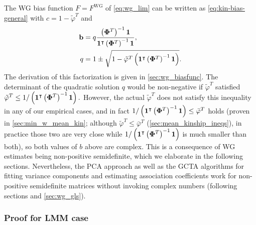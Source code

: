 \documentclass[11pt]{article}
\newcommand{\kinMat}[1][T]{%
  \ensuremath{%
    \mathbf{\Phi}^{#1}
  }%
  \xspace%
}%
\begin{document}
The WG bias function $F = F^\text{WG}$ of \cref{eq:wg_lim} can be written as \cref{eq:kin-bias-general} with
$c = 1 - \tilde{\varphi}^T$ and
\begin{align}
  \label{eq:wg-fac-b}
  \mathbf{b}
  &=
    q \frac{ \left( \kinMat \right)^{-1} \mathbf{1} }{ \mathbf{1}^\intercal \left( \kinMat \right)^{-1} \mathbf{1} }
    , \\
  \label{eq:wg-fac-q}
  q
  &=
    1 \pm \sqrt{1 - \tilde{\varphi}^T \left( \mathbf{1}^\intercal \left( \kinMat \right)^{-1} \mathbf{1} \right) }
.
\end{align}
The derivation of this factorization is given in \cref{sec:wg_biasfunc}.
The determinant of the quadratic solution $q$ would be non-negative if $\tilde{\varphi}^T$ satisfied
$
\tilde{\varphi}^T \le 1 / \left( \mathbf{1}^\intercal \left( \kinMat \right)^{-1} \mathbf{1} \right).
$
However, the actual $\tilde{\varphi}^T$ does not satisfy this inequality in any of our empirical cases, and in fact $1 / \left( \mathbf{1}^\intercal \left( \kinMat \right)^{-1} \mathbf{1} \right) \le \bar{\varphi}^T$ holds (proven in \cref{sec:min_w_mean_kin}; although $\tilde{\varphi}^T \le \bar{\varphi}^T$ (\cref{sec:mean_kinship_ineqs}), in practice those two are very close while $1 / \left( \mathbf{1}^\intercal \left( \kinMat \right)^{-1} \mathbf{1} \right)$ is much smaller than both), so both values of $b$ above are complex.
This is a consequence of WG estimates being non-positive semidefinite, which we elaborate in the following sections.
Nevertheless, the PCA approach as well as the GCTA algorithms for fitting variance components and estimating association coefficients work for non-positive semidefinite matrices without invoking complex numbers (following sections and \cref{sec:wg_gls}).

\subsubsection{Proof for LMM case}
\end{document}
